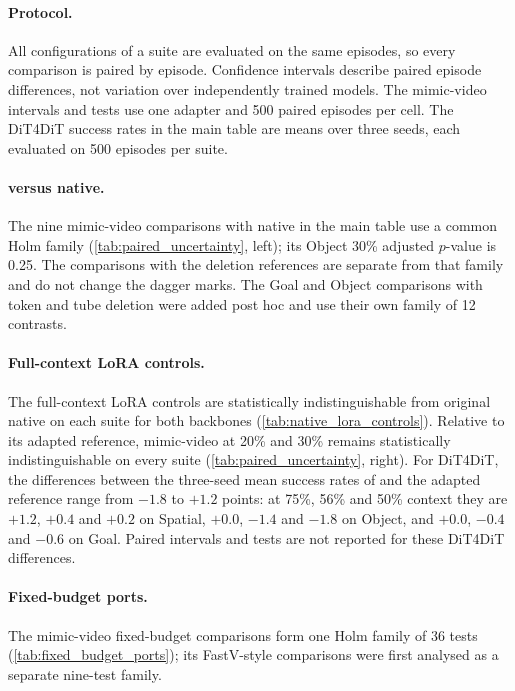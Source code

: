 \paragraph{Protocol.}
All configurations of a suite are evaluated on the same episodes, so every comparison is paired by episode.
Confidence intervals describe paired episode differences, not variation over independently trained models.
The mimic-video intervals and tests use one adapter and 500 paired episodes per cell.
The DiT4DiT success rates in the main table are means over three seeds, each evaluated on 500 episodes per suite.

\paragraph{\method versus native.}
The nine mimic-video comparisons with native in the main table use a common Holm family (\cref{tab:paired_uncertainty}, left); its Object 30\% adjusted $p$-value is 0.25.
The comparisons with the deletion references are separate from that family and do not change the dagger marks.
The Goal and Object comparisons with token and tube deletion were added post hoc and use their own family of 12 contrasts.

\paragraph{Full-context LoRA controls.}
The full-context LoRA controls are statistically indistinguishable from original native on each suite for both backbones (\cref{tab:native_lora_controls}).
Relative to its adapted reference, mimic-video at 20\% and 30\% remains statistically indistinguishable on every suite (\cref{tab:paired_uncertainty}, right).
For DiT4DiT, the differences between the three-seed mean success rates of  and the adapted reference range from $-1.8$ to $+1.2$ points: at 75\%, 56\% and 50\% context they are $+1.2$, $+0.4$ and $+0.2$ on Spatial, $+0.0$, $-1.4$ and $-1.8$ on Object, and $+0.0$, $-0.4$ and $-0.6$ on Goal.
Paired intervals and tests are not reported for these DiT4DiT differences.

\paragraph{Fixed-budget ports.}
The mimic-video fixed-budget comparisons form one Holm family of 36 tests (\cref{tab:fixed_budget_ports}); its FastV-style comparisons were first analysed as a separate nine-test family.

